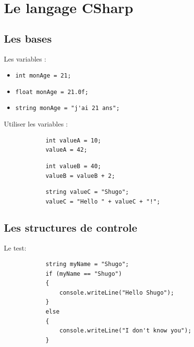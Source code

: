 \documentclass{beamer}
\begin{document}
\section{Le langage CSharp}
\subsection{Les bases}
\begin{frame}
Les variables :
	\begin{itemize}
		\item<1-> \lstinline{int monAge = 21;}
		\item<2-> \lstinline{float monAge = 21.0f;}
		\item<3-> \lstinline{string monAge = "j'ai 21 ans";}
	\end{itemize}
\end{frame}


\begin{frame}[fragile]
Utiliser les variables :

 	\begin{center}
		\begin{lstlisting}
			int valueA = 10;
			valueA = 42;
		\end{lstlisting}
	\end{center}

 	\begin{center}
		\begin{lstlisting}
			int valueB = 40;
			valueB = valueB + 2;
		\end{lstlisting}
	\end{center}

 	\begin{center}
		\begin{lstlisting}
			string valueC = "Shugo";
			valueC = "Hello " + valueC + "!";
		\end{lstlisting}
	\end{center}

\end{frame}

\subsection{Les structures de controle}
\begin{frame}[fragile]
Le test:
		\begin{lstlisting}
			string myName = "Shugo";
			if (myName == "Shugo")
			{
 				console.writeLine("Hello Shugo");
			}
			else
			{
 				console.writeLine("I don't know you");
			}
		\end{lstlisting}

\end{frame}
\end{document}
